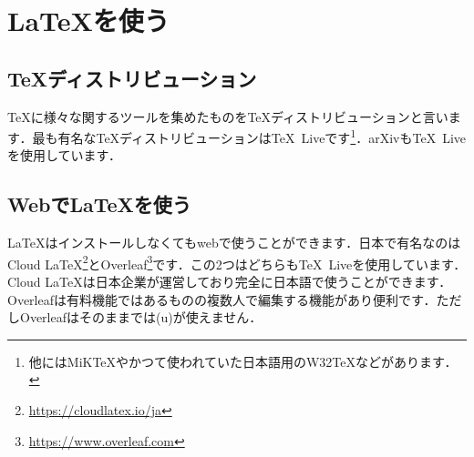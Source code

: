 \section{\LaTeX を使う}
\subsection{\TeX ディストリビューション}
\TeX に様々な関するツールを集めたものを\TeX ディストリビューションと言います．最も有名な\TeX ディストリビューションは\TeX\ Liveです\footnote{他にはMiK\TeX やかつて使われていた日本語用のW32\TeX などがあります．}．arXivも\TeX\ Liveを使用しています．

\subsection{Webで\LaTeX を使う}
\LaTeX はインストールしなくてもwebで使うことができます．日本で有名なのはCloud LaTeX\footnote{\url{https://cloudlatex.io/ja}}とOverleaf\footnote{\url{https://www.overleaf.com}}です．この2つはどちらも\TeX\ Liveを使用しています．Cloud LaTeXは日本企業が運営しており完全に日本語で使うことができます．Overleafは有料機能ではあるものの複数人で編集する機能があり便利です．ただしOverleafはそのままでは(u)\pLaTeX が使えません．